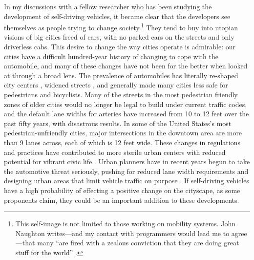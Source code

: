 In my discussions with a fellow researcher who has been studying the
development of self-driving vehicles, it became clear that the
developers see themselves as people trying to change
society.\footnote{This self-image is not limited to those working on
  mobility systems. John Naughton writes---and my contact with
  programmers would lead me to agree---that many ``are fired with a zealous
  conviction that they are doing great stuff for the
  world'' \cite{naughtonTech}.}
They
tend to buy into utopian visions of big cities freed of cars, with no
parked cars on the streets and only driverless cabs. This desire to
change the way cities operate is admirable: our cities have a
difficult hundred-year history of changing to cope with the
automobile, and many of these changes have not been for the better
when looked at through a broad lens. The prevalence of automobiles has
literally re-shaped city centers \cite[p. 7]{burdenCities}, widened
streets \cite[p. 10]{burdenCities} \cite[p. 65]{fernandezBoulder}, and generally made many cities less safe for
pedestrians and bicyclists. Many of the streets in the most pedestrian
friendly zones of older cities would no longer be legal to build under
current traffic codes, and the default lane widths for arteries have increased
from 10 to 12 feet over the past fifty years, with disastrous results.\cite{citylab} In some of the
United States's most pedestrian-unfriendly cities, major intersections
in the downtown area are more than 9 lanes across, each of which is 12
feet wide. These changes in 
regulations and practices have contributed to more sterile urban
centers with reduced potential for vibrant civic life \cite[p. 60]{miaraBoston}. Urban planners have
in recent years begun to take the automotive threat seriously, pushing
for reduced lane width requirements and designing urban areas that
limit vehicle traffic on purpose \cite[p. 67]{fernandezBoulder}. If self-driving
vehicles have a high probability of effecting a positive change on the
cityscape, as some proponents claim, they could be an important
addition to these developments.

